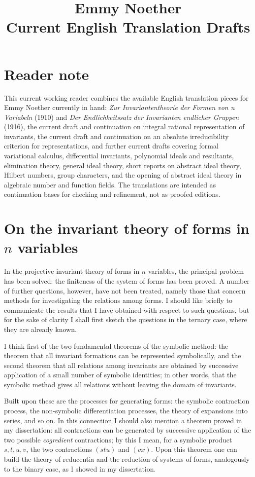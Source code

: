 \documentclass[11pt]{article}
\title{Emmy Noether\\Current English Translation Drafts}
\author{}
\date{}
\begin{document}
\maketitle

\section*{Reader note}
This current working reader combines the available English translation pieces for Emmy Noether currently in hand:
\emph{Zur Invariantentheorie der Formen von n Variabeln} (1910) and
\emph{Der Endlichkeitssatz der Invarianten endlicher Gruppen} (1916), the current draft and continuation on integral rational representation of invariants, the current draft and continuation on an absolute irreducibility criterion for representations, and further current drafts covering formal variational calculus, differential invariants, polynomial ideals and resultants, elimination theory, general ideal theory, short reports on abstract ideal theory, Hilbert numbers, group characters, and the opening of abstract ideal theory in algebraic number and function fields.
The translations are intended as continuation bases for checking and refinement, not as proofed editions.

\section*{On the invariant theory of forms in $n$ variables}

In the projective invariant theory of forms in $n$ variables, the principal problem has been solved: the finiteness of the system of forms has been proved. A number of further questions, however, have not been treated, namely those that concern methods for investigating the relations among forms. I should like briefly to communicate the results that I have obtained with respect to such questions, but for the sake of clarity I shall first sketch the questions in the ternary case, where they are already known.

I think first of the two fundamental theorems of the symbolic method: the theorem that all invariant formations can be represented symbolically, and the second theorem that all relations among invariants are obtained by successive application of a small number of symbolic identities; in other words, that the symbolic method gives all relations without leaving the domain of invariants.

Built upon these are the processes for generating forms: the symbolic contraction process, the non-symbolic differentiation processes, the theory of expansions into series, and so on. In this connection I should also mention a theorem proved in my dissertation: all contractions can be generated by successive application of the two possible \emph{cogredient} contractions; by this I mean, for a symbolic product $s,t,u,v$, the two contractions $(stu)$ and $(vx)$. Upon this theorem one can build the theory of reducentia and the reduction of systems of forms, analogously to the binary case, as I showed in my dissertation.
\end{document}
